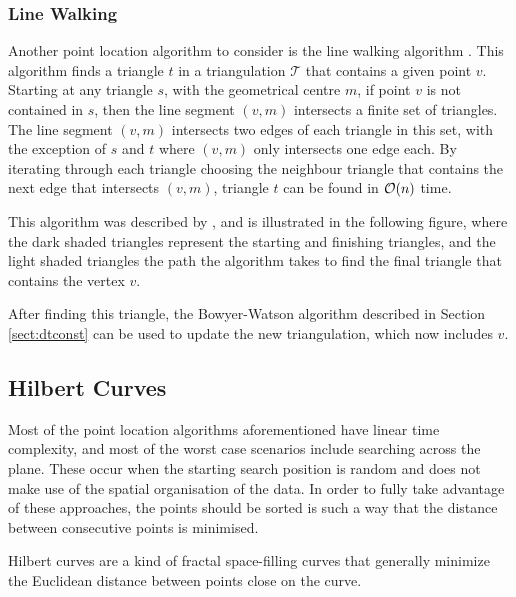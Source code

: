 \subsubsection*{Line Walking}
Another point location algorithm to consider is the line walking algorithm \cite{walking}. This algorithm finds a triangle $t$ in a triangulation $\mathcal{T}$ that contains a given point $v$. 
Starting at any triangle $s$, with the geometrical centre $m$, if point $v$ is not contained in $s$, then the line segment $(v,m)$ intersects a finite set of triangles.  
The line segment $(v,m)$ intersects two edges of each triangle in this set, with the exception of $s$ and $t$ where $(v,m)$ only intersects one edge each. 
By iterating through each triangle choosing the neighbour triangle that contains the next edge that intersects $(v,m)$, triangle $t$ can be found in $\mathcal{O}(n)$ time.

This algorithm was described by \citet{walking}, and is illustrated in the following figure, where the dark shaded triangles represent the starting and finishing triangles, and the light shaded triangles the path the algorithm takes to find the final triangle that contains the vertex $v$.

After finding this triangle, the Bowyer-Watson algorithm described in Section \ref{sect:dtconst} can be used to update the new triangulation, which now includes $v$.
\subsection{Hilbert Curves}

Most of the point location algorithms aforementioned have linear time complexity, and most of the worst case scenarios include searching across the plane. These occur when the starting search position is random and does not make use of the spatial organisation of the data. In order to fully take advantage of these approaches, the points should be sorted is such a way that the distance between consecutive points is minimised.

Hilbert curves are a kind of fractal space-filling curves \cite{sfcurves} that generally minimize the Euclidean distance between points close on the curve.

